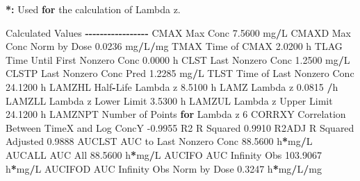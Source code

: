 \documentclass[
  10pt,
]{krantz}
\makeatletter
\newenvironment{Shaded}{\begin{snugshade}}{\end{snugshade}}
\newcommand{\ControlFlowTok}[1]{\textcolor[rgb]{0.13,0.29,0.53}{\textbf{#1}}}
\newcommand{\DecValTok}[1]{\textcolor[rgb]{0.00,0.00,0.81}{#1}}
\newcommand{\ErrorTok}[1]{\textcolor[rgb]{0.64,0.00,0.00}{\textbf{#1}}}
\newcommand{\FloatTok}[1]{\textcolor[rgb]{0.00,0.00,0.81}{#1}}
\newcommand{\NormalTok}[1]{#1}
\newcommand{\OperatorTok}[1]{\textcolor[rgb]{0.81,0.36,0.00}{\textbf{#1}}}
\newcommand{\StringTok}[1]{\textcolor[rgb]{0.31,0.60,0.02}{#1}}
\newenvironment{kframe}{%
\medskip{}
\setlength{\fboxsep}{.8em}
 \def\at@end@of@kframe{}%
 \ifinner\ifhmode%
  \def\at@end@of@kframe{\end{minipage}}%
  \begin{minipage}{\columnwidth}%
 \fi\fi%
 \def\FrameCommand##1{\hskip\@totalleftmargin \hskip-\fboxsep
 \colorbox{shadecolor}{##1}\hskip-\fboxsep
     \hskip-\linewidth \hskip-\@totalleftmargin \hskip\columnwidth}%
 \MakeFramed {\advance\hsize-\width
   \@totalleftmargin\z@ \linewidth\hsize
   \@setminipage}}%
 {\par\unskip\endMakeFramed%
 \at@end@of@kframe}
\renewenvironment{Shaded}{\begin{kframe}}{\end{kframe}}
\makeatother
\begin{document}
\begin{Shaded}
\begin{Highlighting}[]
\OperatorTok{*}\ErrorTok{:}\StringTok{ }\NormalTok{Used }\ControlFlowTok{for}\NormalTok{ the calculation of Lambda z.}


\NormalTok{Calculated Values}
\OperatorTok{{-}{-}{-}{-}{-}{-}{-}{-}{-}{-}{-}{-}{-}{-}{-}{-}{-}}
\NormalTok{CMAX       Max Conc                                        }\FloatTok{7.5600}\NormalTok{ mg}\OperatorTok{/}\NormalTok{L}
\NormalTok{CMAXD      Max Conc Norm by Dose                           }\FloatTok{0.0236}\NormalTok{ mg}\OperatorTok{/}\NormalTok{L}\OperatorTok{/}\NormalTok{mg}
\NormalTok{TMAX       Time of CMAX                                    }\FloatTok{2.0200}\NormalTok{ h}
\NormalTok{TLAG       Time Until First Nonzero Conc                   }\FloatTok{0.0000}\NormalTok{ h}
\NormalTok{CLST       Last Nonzero Conc                               }\FloatTok{1.2500}\NormalTok{ mg}\OperatorTok{/}\NormalTok{L}
\NormalTok{CLSTP      Last Nonzero Conc Pred                          }\FloatTok{1.2285}\NormalTok{ mg}\OperatorTok{/}\NormalTok{L}
\NormalTok{TLST       Time of Last Nonzero Conc                      }\FloatTok{24.1200}\NormalTok{ h}
\NormalTok{LAMZHL     Half}\OperatorTok{{-}}\NormalTok{Life Lambda z                              }\FloatTok{8.5100}\NormalTok{ h}
\NormalTok{LAMZ       Lambda z                                        }\FloatTok{0.0815} \OperatorTok{/}\NormalTok{h}
\NormalTok{LAMZLL     Lambda z Lower Limit                            }\FloatTok{3.5300}\NormalTok{ h}
\NormalTok{LAMZUL     Lambda z Upper Limit                           }\FloatTok{24.1200}\NormalTok{ h}
\NormalTok{LAMZNPT    Number of Points }\ControlFlowTok{for}\NormalTok{ Lambda z                   }\DecValTok{6}
\NormalTok{CORRXY     Correlation Between TimeX and Log ConcY        }\FloatTok{{-}0.9955} 
\NormalTok{R2         R Squared                                       }\FloatTok{0.9910} 
\NormalTok{R2ADJ      R Squared Adjusted                              }\FloatTok{0.9888} 
\NormalTok{AUCLST     AUC to Last Nonzero Conc                       }\FloatTok{88.5600}\NormalTok{ h}\OperatorTok{*}\NormalTok{mg}\OperatorTok{/}\NormalTok{L}
\NormalTok{AUCALL     AUC All                                        }\FloatTok{88.5600}\NormalTok{ h}\OperatorTok{*}\NormalTok{mg}\OperatorTok{/}\NormalTok{L}
\NormalTok{AUCIFO     AUC Infinity Obs                              }\FloatTok{103.9067}\NormalTok{ h}\OperatorTok{*}\NormalTok{mg}\OperatorTok{/}\NormalTok{L}
\NormalTok{AUCIFOD    AUC Infinity Obs Norm by Dose                   }\FloatTok{0.3247}\NormalTok{ h}\OperatorTok{*}\NormalTok{mg}\OperatorTok{/}\NormalTok{L}\OperatorTok{/}\NormalTok{mg}

\end{Highlighting}
\end{Shaded}
\end{document}
